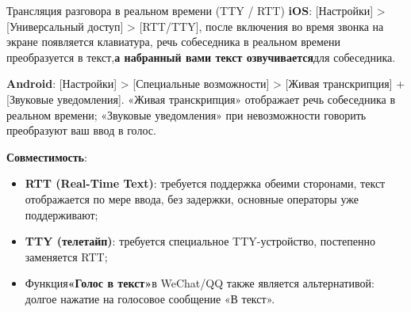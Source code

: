 \begin{tcbinfo}{Трансляция разговора в реальном времени (TTY / RTT)}
\textbf{iOS}: [Настройки] > [Универсальный доступ] > [RTT/TTY], после включения во время звонка на экране появляется клавиатура, речь собеседника в реальном времени преобразуется в текст,\textbf{а набранный вами текст озвучивается}для собеседника.

\textbf{Android}: [Настройки] > [Специальные возможности] > [Живая транскрипция] + [Звуковые уведомления]. «Живая транскрипция» отображает речь собеседника в реальном времени; «Звуковые уведомления» при невозможности говорить преобразуют ваш ввод в голос.

\textbf{Совместимость}:

\begin{itemize}
  \item \textbf{RTT (Real-Time Text)}: требуется поддержка обеими сторонами, текст отображается по мере ввода, без задержки, основные операторы уже поддерживают;
  \item \textbf{TTY (телетайп)}: требуется специальное TTY-устройство, постепенно заменяется RTT;
  \item Функция\textbf{«Голос в текст»}в WeChat/QQ также является альтернативой: долгое нажатие на голосовое сообщение «В текст».
\end{itemize}

\end{tcbinfo}


